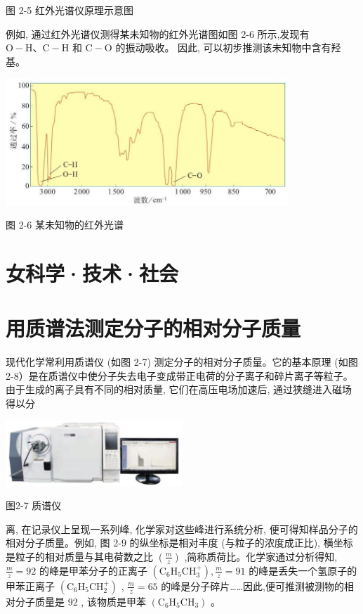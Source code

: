 \documentclass[10pt]{article}
\begin{document}
图 2-5 红外光谱仪原理示意图

例如, 通过红外光谱仪测得某未知物的红外光谱图如图 2-6 所示,发现有 \(\mathrm{O} - \mathrm{H}\text{、}\mathrm{C} - \mathrm{H}\) 和 \(\mathrm{C} - \mathrm{O}\) 的振动吸收。 因此, 可以初步推测该未知物中含有羟基。

\begin{center}
\includegraphics[max width=0.8\textwidth]{images/0190e026-5a11-7df7-bd27-54d09026ba7a_45_921611.jpg}
\end{center}

图 2-6 某未知物的红外光谱

\section*{女科学·技术·社会}

\section*{用质谱法测定分子的相对分子质量}

现代化学常利用质谱仪 (如图 2-7) 测定分子的相对分子质量。它的基本原理 (如图 2-8）是在质谱仪中使分子失去电子变成带正电荷的分子离子和碎片离子等粒子。由于生成的离子具有不同的相对质量, 它们在高压电场加速后, 通过狭缝进入磁场得以分

\begin{center}
\includegraphics[max width=0.5\textwidth]{images/0190e026-5a11-7df7-bd27-54d09026ba7a_45_610417.jpg}
\end{center}

图2-7 质谱仪

离, 在记录仪上呈现一系列峰, 化学家对这些峰进行系统分析, 便可得知样品分子的相对分子质量。例如, 图 2-9 的纵坐标是相对丰度 (与粒子的浓度成正比), 横坐标是粒子的相对质量与其电荷数之比 \(\left( \frac{m}{z}\right)\) ,简称质荷比。化学家通过分析得知, \(\frac{m}{z} = {92}\) 的峰是甲苯分子的正离子 \(\left( {{\mathrm{C}}_{6}{\mathrm{H}}_{5}{\mathrm{{CH}}}_{3}^{ + }}\right) ,\frac{m}{z} = {91}\) 的峰是丢失一个氢原子的甲苯正离子 \(\left( {{\mathrm{C}}_{6}{\mathrm{H}}_{5}{\mathrm{{CH}}}_{2}^{ + }}\right)\) , \(\frac{m}{z} = {65}\) 的峰是分子碎片……因此,便可推测被测物的相对分子质量是 92 , 该物质是甲苯 \(\left( {{\mathrm{C}}_{6}{\mathrm{H}}_{5}{\mathrm{{CH}}}_{3}}\right)\) 。
\end{document}
